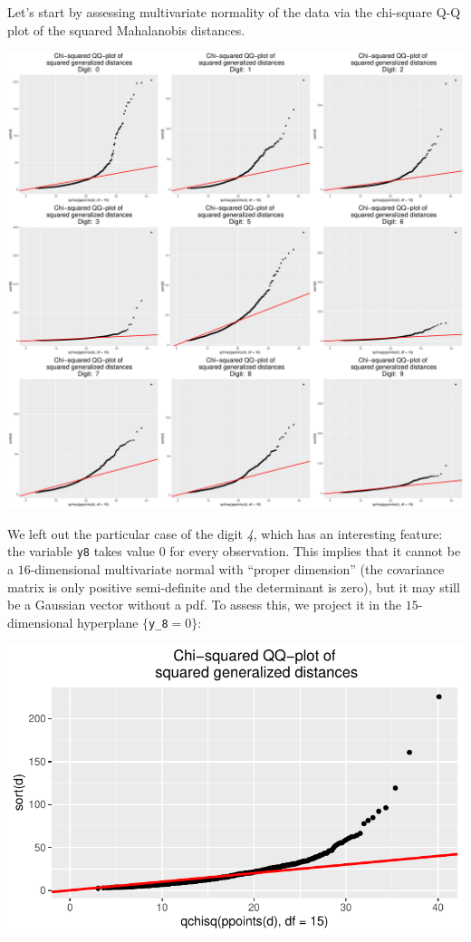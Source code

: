 \documentclass[
  letterpaper,
  DIV=11,
  numbers=noendperiod]{scrartcl}
\begin{document}
Let's start by assessing multivariate normality of the data via the
chi-square Q-Q plot of the squared Mahalanobis distances.

\includegraphics{ProblemSet2_files/figure-pdf/unnamed-chunk-62-1.pdf}

We left out the particular case of the digit \emph{4}, which has an
interesting feature: the variable \texttt{y8} takes value \(0\) for
every observation. This implies that it cannot be a \(16\)-dimensional
multivariate normal with ``proper dimension'' (the covariance matrix is
only positive semi-definite and the determinant is zero), but it may
still be a Gaussian vector without a pdf. To assess this, we project it
in the \(15\)-dimensional hyperplane \(\{\)\texttt{y\_8}\(=0\}\):

\includegraphics{ProblemSet2_files/figure-pdf/unnamed-chunk-63-1.pdf}
\end{document}
